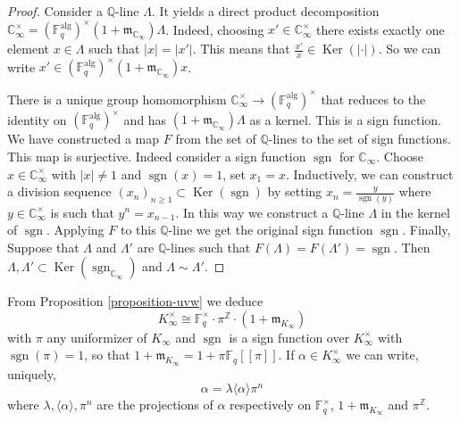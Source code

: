 \documentclass[11pt]{amsart}
\numberwithin{equation}{section}
\newcommand{\ZZ}{\mathbb{Z}}
\newcommand{\FF}{\mathbb{F}}
\newcommand{\CC}{\mathbb{C}}
\newcommand{\QQ}{\mathbb{Q}}
\newcommand{\sgn}{\operatorname{sgn}}
\begin{document}
\begin{proof}
Consider a $\QQ$-line $\Lambda$. It yields a direct product decomposition $\CC_\infty^\times=(\FF_q^{\text{alg}})^\times(1+\mathfrak{m}_{\CC_\infty})\Lambda$. Indeed, choosing $x'\in\CC_\infty^\times$ there exists exactly one element $x\in\Lambda$ such that 
$|x|=|x'|$. This means that $\frac{x'}{x}\in\operatorname{Ker}(|\cdot|)$. So we can write $x'\in(\FF_q^{\text{alg}})^\times(1+\mathfrak{m}_{\CC_\infty})x$. 

There is a unique group homomorphism $\CC_\infty^\times\rightarrow(\FF_q^{\text{alg}})^\times$ that reduces to the identity on $(\FF_q^{\text{alg}})^\times$ and has $(1+\mathfrak{m}_{\CC_\infty})\Lambda$ as a kernel. This is a sign function. We have constructed a map $F$ from the set of $\QQ$-lines to the set
of sign functions. This map is surjective. Indeed consider a sign function $\sgn$ for $\CC_\infty$. Choose $x\in\CC_\infty^\times$ with $|x|\neq1$ and $\sgn(x)=1$, set $x_1=x$. Inductively, we can construct a division sequence $(x_n)_{n\geq 1}\subset\operatorname{Ker}(\sgn)$
by setting $x_n=\frac{y}{\sgn(y)}$ where $y\in\CC_\infty^\times$ is such that $y^n=x_{n-1}$. In this way we construct a $\QQ$-line 
$\Lambda$ in the kernel of $\sgn$. Applying $F$ to this $\QQ$-line 
we get the original sign function $\sgn$. Finally, Suppose that $\Lambda$ and $\Lambda'$ are $\QQ$-lines
such that $F(\Lambda)=F(\Lambda')=\sgn$. Then $\Lambda,\Lambda'\subset\operatorname{Ker}(\sgn_{\CC_\infty})$ and $\Lambda\sim\Lambda'$.
\end{proof}


From Proposition \ref{proposition-uvw} we deduce
\begin{equation}\label{k-infty-decomposition}
K_\infty^\times\cong\FF_q^{\times}\cdot \pi^\ZZ\cdot (1+\mathfrak{m}_{K_\infty})
\end{equation}
with $\pi$ any uniformizer of $K_\infty$ and $\sgn$ is a sign function over $K_\infty^\times$ with $\sgn(\pi)=1$, so that $1+\mathfrak{m}_{K_\infty}=1+\pi\FF_q[[\pi]]$. If $\alpha\in K_\infty^\times$ we can write, uniquely, 
\begin{equation}\label{coordinates}
\alpha=\lambda\langle\alpha\rangle \pi^n
\end{equation}
where $\lambda,\langle\alpha\rangle, \pi^n$ are the projections of $\alpha$  respectively on $\FF_q^\times$, $1+\mathfrak{m}_{K_\infty}$ and $\pi^\ZZ$.
\end{document}
